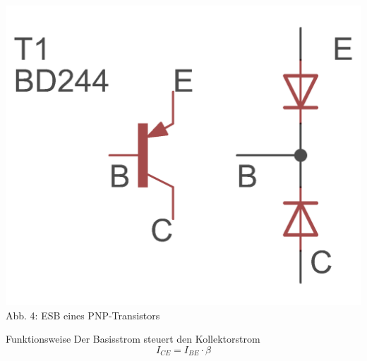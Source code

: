 \begin{frame}
\begin{minipage}{0.4\textwidth}
	\includegraphics[scale=1.4]{e13/PNP_esb.png}\\
	Abb. 4: ESB eines PNP-Transistors
\end{minipage}

\begin{center}
\begin{block}{Funktionsweise}
Der Basisstrom steuert den Kollektorstrom
$$I_{CE} = I_{BE} \cdot \beta$$
\end{block}
\end{center}
\end{frame}

